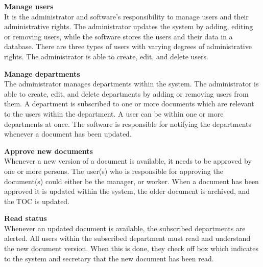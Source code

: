 \textbf{Manage users}
\\
It is the administrator and software's responsibility to manage users and their administrative rights.
The administrator updates the system by adding, editing or removing users, while the software stores the users and their data in a database.
There are three types of users with varying degrees of administrative rights.
The administrator is able to create, edit, and delete users.

\textbf{Manage departments}
\\
The administrator manages departments within the system.
The administrator is able to create, edit, and delete departments by adding or removing users from them.
A department is subscribed to one or more documents which are relevant to the users within the department.
A user can be within one or more departments at once.
The software is responsible for notifying the departments whenever a document has been updated.

\textbf{Approve new documents}
\\
Whenever a new version of a document is available, it needs to be approved by one or more persons.
The user(s) who is responsible for approving the document(s) could either be the manager, or worker.
When a document has been approved it is updated within the system, the older document is archived, and the TOC is updated.

\textbf{Read status}
\\
Whenever an updated document is available, the subscribed departments are alerted.
All users within the subscribed department must read and understand the new document version.
When this is done, they check off box which indicates to the system and secretary that the new document has been read.
